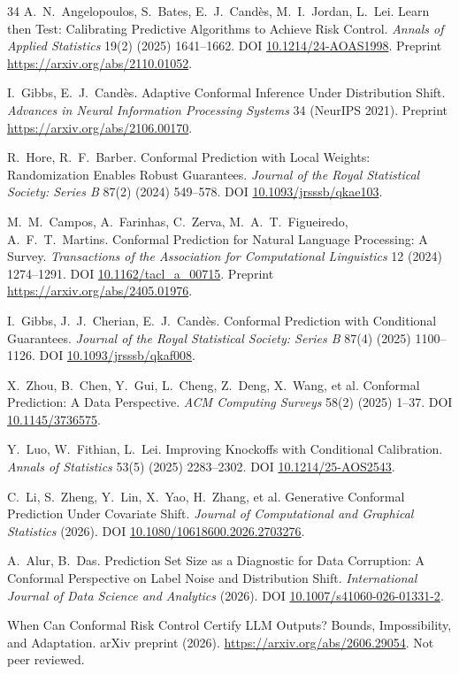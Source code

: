 \documentclass[a4paper,longmktitle]{cas-sc}
\begin{document}
\begin{thebibliography}{34}
 A.~N.~Angelopoulos, S.~Bates, E.~J.~Cand\`es, M.~I.~Jordan, L.~Lei. Learn then Test: Calibrating Predictive Algorithms to Achieve Risk Control. \emph{Annals of Applied Statistics} 19(2) (2025) 1641--1662. DOI \url{10.1214/24-AOAS1998}. Preprint \url{https://arxiv.org/abs/2110.01052}.

 I.~Gibbs, E.~J.~Cand\`es. Adaptive Conformal Inference Under Distribution Shift. \emph{Advances in Neural Information Processing Systems} 34 (NeurIPS 2021). Preprint \url{https://arxiv.org/abs/2106.00170}.

 R.~Hore, R.~F.~Barber. Conformal Prediction with Local Weights: Randomization Enables Robust Guarantees. \emph{Journal of the Royal Statistical Society: Series B} 87(2) (2024) 549--578. DOI \url{10.1093/jrsssb/qkae103}.

 M.~M.~Campos, A.~Farinhas, C.~Zerva, M.~A.~T.~Figueiredo, A.~F.~T.~Martins. Conformal Prediction for Natural Language Processing: A Survey. \emph{Transactions of the Association for Computational Linguistics} 12 (2024) 1274--1291. DOI \url{10.1162/tacl_a_00715}. Preprint \url{https://arxiv.org/abs/2405.01976}.

 I.~Gibbs, J.~J.~Cherian, E.~J.~Cand\`es. Conformal Prediction with Conditional Guarantees. \emph{Journal of the Royal Statistical Society: Series B} 87(4) (2025) 1100--1126. DOI \url{10.1093/jrsssb/qkaf008}.

 X.~Zhou, B.~Chen, Y.~Gui, L.~Cheng, Z.~Deng, X.~Wang, et al. Conformal Prediction: A Data Perspective. \emph{ACM Computing Surveys} 58(2) (2025) 1--37. DOI \url{10.1145/3736575}.

 Y.~Luo, W.~Fithian, L.~Lei. Improving Knockoffs with Conditional Calibration. \emph{Annals of Statistics} 53(5) (2025) 2283--2302. DOI \url{10.1214/25-AOS2543}.

 C.~Li, S.~Zheng, Y.~Lin, X.~Yao, H.~Zhang, et al. Generative Conformal Prediction Under Covariate Shift. \emph{Journal of Computational and Graphical Statistics} (2026). DOI \url{10.1080/10618600.2026.2703276}.

 A.~Alur, B.~Das. Prediction Set Size as a Diagnostic for Data Corruption: A Conformal Perspective on Label Noise and Distribution Shift. \emph{International Journal of Data Science and Analytics} (2026). DOI \url{10.1007/s41060-026-01331-2}.

 When Can Conformal Risk Control Certify LLM Outputs? Bounds, Impossibility, and Adaptation. arXiv preprint (2026). \url{https://arxiv.org/abs/2606.29054}. Not peer reviewed.


\end{thebibliography}
\end{document}
